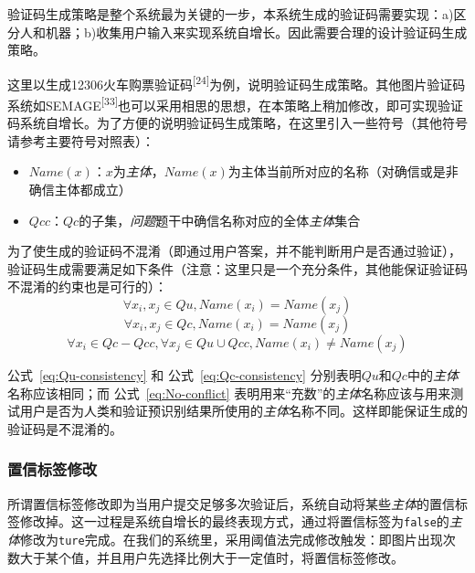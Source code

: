 \documentclass[bachelor,zhspacing]{cqu}  %
\begin{document}
验证码生成策略是整个系统最为关键的一步，本系统生成的验证码需要实现：a)区分人和机器；b)收集用户输入来实现系统自增长。因此需要合理的设计验证码生成策略。

这里以生成12306火车购票验证码\textsuperscript{{[}24{]}}为例，说明验证码生成策略。其他图片验证码系统如SEMAGE\textsuperscript{{[}33{]}}也可以采用相思的思想，在本策略上稍加修改，即可实现验证码系统自增长。为了方便的说明验证码生成策略，在这里引入一些符号（其他符号请参考主要符号对照表）：

\begin{itemize}
\item
  \(Name(x)\)：\(x\)为\emph{主体}，\(Name(x)\)为主体当前所对应的名称（对确信或是非确信主体都成立）
\item
  \(Qcc\)：\(Qc\)的子集，\emph{问题}题干中确信名称对应的全体\emph{主体}集合
\end{itemize}

为了使生成的验证码不混淆（即通过用户答案，并不能判断用户是否通过验证），验证码生成需要满足如下条件（注意：这里只是一个充分条件，其他能保证验证码不混淆的约束也是可行的）：
\begin{equation}\forall x_i,x_j \in Qu , Name(x_i) = Name(x_j)\label{eq:Qu-consistency}\end{equation}
\begin{equation}\forall x_i,x_j \in Qc , Name(x_i) = Name(x_j)\label{eq:Qc-consistency}\end{equation}
\begin{equation}\forall x_i \in Qc-Qcc ,\forall x_j \in Qu \cup Qcc , Name(x_i) \neq Name(x_j)\label{eq:No-conflict}\end{equation}

公式~\ref{eq:Qu-consistency} 和 公式~\ref{eq:Qc-consistency}
分别表明\(Qu\)和\(Qc\)中的\emph{主体}名称应该相同；而
公式~\ref{eq:No-conflict}
表明用来``充数''的\emph{主体}名称应该与用来测试用户是否为人类和验证预识别结果所使用的\emph{主体}名称不同。这样即能保证生成的验证码是不混淆的。

\subsubsection{置信标签修改}\label{ux7f6eux4fe1ux6807ux7b7eux4feeux6539}

所谓置信标签修改即为当用户提交足够多次验证后，系统自动将某些\emph{主体}的置信标签修改掉。这一过程是系统自增长的最终表现方式，通过将置信标签为\texttt{false}的\emph{主体}修改为\texttt{ture}完成。在我们的系统里，采用阈值法完成修改触发：即图片出现次数大于某个值，并且用户先选择比例大于一定值时，将置信标签修改。
\end{document}
